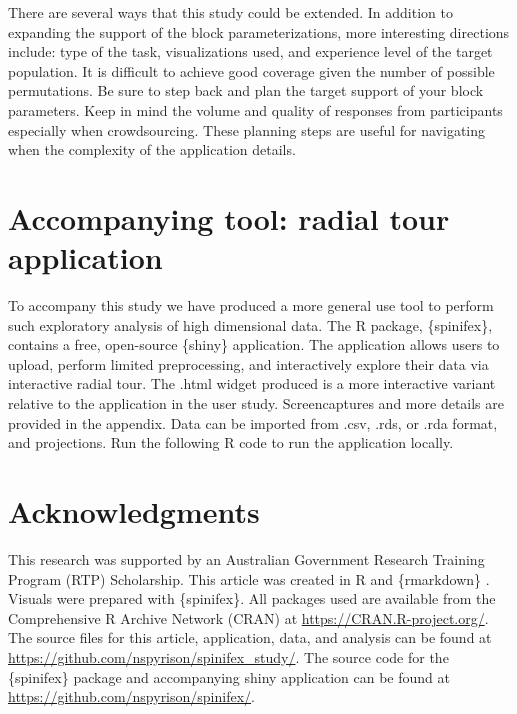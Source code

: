 \documentclass{monashthesis}
\begin{document}
There are several ways that this study could be extended. In addition to expanding the support of the block parameterizations, more interesting directions include: type of the task, visualizations used, and experience level of the target population. It is difficult to achieve good coverage given the number of possible permutations. Be sure to step back and plan the target support of your block parameters. Keep in mind the volume and quality of responses from participants especially when crowdsourcing. These planning steps are useful for navigating when the complexity of the application details.

\hypertarget{sec:spinifex}{%
\section{Accompanying tool: radial tour application}\label{sec:spinifex}}

To accompany this study we have produced a more general use tool to perform such exploratory analysis of high dimensional data. The R package, \{spinifex\}, \autocite{spyrison_spinifex_2020} contains a free, open-source \{shiny\} \autocite{chang_shiny_2020} application. The application allows users to upload, perform limited preprocessing, and interactively explore their data via interactive radial tour. The .html widget produced is a more interactive variant relative to the application in the user study. Screencaptures and more details are provided in the appendix. Data can be imported from .csv, .rds, or .rda format, and projections. Run the following R code to run the application locally.

\begin{Shaded}
\begin{Highlighting}[]
\NormalTok{(}\NormalTok{, } \NormalTok{)}
\SpecialCharTok{::}\NormalTok{(}\NormalTok{)}
\end{Highlighting}
\end{Shaded}

\hypertarget{sec:acknowledgments}{%
\section{Acknowledgments}\label{sec:acknowledgments}}

This research was supported by an Australian Government Research Training Program (RTP) Scholarship. This article was created in R \autocite{r_core_team_r:_2020} and \{rmarkdown\} \autocite{xie_r_2018}. Visuals were prepared with \{spinifex\}. All packages used are available from the Comprehensive R Archive Network (CRAN) at \url{https://CRAN.R-project.org/}. The source files for this article, application, data, and analysis can be found at \url{https://github.com/nspyrison/spinifex_study/}. The source code for the \{spinifex\} package and accompanying shiny application can be found at \url{https://github.com/nspyrison/spinifex/}.

\printbibliography[heading=bibintoc]
\end{document}
